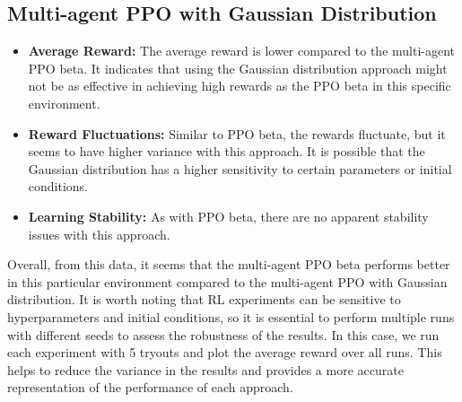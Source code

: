 \subsection{Multi-agent PPO with Gaussian Distribution}\label{subsec:multi-agent-ppo-with-gaussian-distribution}
\begin{itemize}
    \item \textbf{Average Reward:} The average reward is lower compared to the multi-agent PPO beta. It indicates that using the Gaussian distribution approach might not be as effective in achieving high rewards as the PPO beta in this specific environment.
    \item \textbf{Reward Fluctuations:} Similar to PPO beta, the rewards fluctuate, but it seems to have higher variance with this approach. It is possible that the Gaussian distribution has a higher sensitivity to certain parameters or initial conditions.
    \item \textbf{Learning Stability:} As with PPO beta, there are no apparent stability issues with this approach.
\end{itemize}
Overall, from this data, it seems that the multi-agent PPO beta performs better in this particular environment compared to the multi-agent PPO with Gaussian distribution.
It is worth noting that RL experiments can be sensitive to hyperparameters and initial conditions, so it is essential to perform multiple runs with different seeds to assess the robustness of the results. In this case, we run each experiment with 5 tryouts and plot the average reward over all runs. This helps to reduce the variance in the results and provides a more accurate representation of the performance of each approach.

